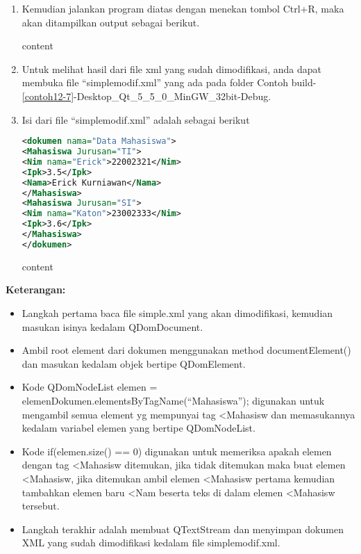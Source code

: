 \begin{enumerate}
\item
  Kemudian jalankan program diatas dengan menekan tombol Ctrl+R, maka
  akan ditampilkan output sebagai berikut.
  \begin{lcverbatim}
  	content
  \end{lcverbatim}
\item
  Untuk melihat hasil dari file xml yang sudah dimodifikasi, anda dapat
  membuka file ``simplemodif.xml'' yang ada pada folder Contoh
  build-\ref{contoh12-7}-Desktop\_Qt\_5\_5\_0\_MinGW\_32bit-Debug.
\item
  Isi dari file ``simplemodif.xml'' adalah sebagai berikut

\begin{lstlisting}[language=xml]
<dokumen nama="Data Mahasiswa">
<Mahasiswa Jurusan="TI">
<Nim nama="Erick">22002321</Nim>
<Ipk>3.5</Ipk>
<Nama>Erick Kurniawan</Nama>
</Mahasiswa>
<Mahasiswa Jurusan="SI">
<Nim nama="Katon">23002333</Nim>
<Ipk>3.6</Ipk>
</Mahasiswa>
</dokumen>
\end{lstlisting}
\begin{lcverbatim}
	content
\end{lcverbatim}
\end{enumerate}

\textbf{Keterangan:}

\begin{itemize}

\item
  Langkah pertama baca file simple.xml yang akan dimodifikasi, kemudian
  masukan isinya kedalam QDomDocument.
\item
  Ambil root element dari dokumen menggunakan method documentElement()
  dan masukan kedalam objek bertipe QDomElement.
\item
  Kode QDomNodeList elemen =
  elemenDokumen.elementsByTagName(``Mahasiswa''); digunakan untuk
  mengambil semua element yg mempunyai tag \textless{}Mahasisw dan
  memasukannya kedalam variabel elemen yang bertipe QDomNodeList.
\item
  Kode if(elemen.size() == 0) digunakan untuk memeriksa apakah elemen
  dengan tag \textless{}Mahasisw ditemukan, jika tidak ditemukan maka
  buat elemen \textless{}Mahasisw, jika ditemukan ambil elemen
  \textless{}Mahasisw pertama kemudian tambahkan elemen baru
  \textless{}Nam beserta teks di dalam elemen \textless{}Mahasisw
  tersebut.
\item
  Langkah terakhir adalah membuat QTextStream dan menyimpan dokumen XML
  yang sudah dimodifikasi kedalam file simplemodif.xml.
\end{itemize}

